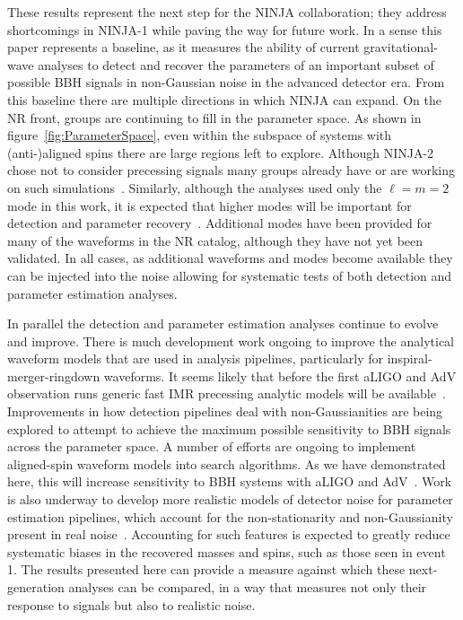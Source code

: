 \documentclass[12pt]{iopart}
\begin{document}
These results represent the next step for the NINJA collaboration;
they address shortcomings in NINJA-1 while paving the way
for future work.  In a sense this paper represents a baseline, as it
measures the ability of current gravitational-wave analyses to detect
and recover the parameters of an important subset of possible BBH
signals in non-Gaussian noise in the advanced detector era. 
From this baseline there are
multiple directions in which NINJA can expand. On the NR front,
groups are continuing to fill in the parameter space.  As shown in
figure~\ref{fig:ParameterSpace}, even within the subspace of systems
with (anti-)aligned spins there are large regions left to explore.
Although NINJA-2 chose not to consider precessing signals many groups
already have or are working on such simulations~\cite{
Campanelli:2008nk, Tichy:2007hk, Tichy:2008du,Schmidt:2010it,
O'Shaughnessy:2011fx,Mroue:2012kv,O'Shaughnessy:2012vm,
O'Shaughnessy:2012ay,Hinder:2013oqa,Taracchini:2013rva}. Similarly, although 
the analyses used only the
$\ell=m=2$ mode in this work, it is expected that higher modes will be
important for detection and parameter
recovery~\cite{Pekowsky:2012sr,Healy:2013jza,McWilliams:2010eq,Brown:2012nn,
Pan:2011gk}.  Additional modes have been provided for many of
the waveforms in the NR catalog, although they have not yet been
validated.  In all cases, as additional waveforms and modes become
available they can be injected into the noise allowing for systematic
tests of both detection and parameter estimation analyses.

In parallel the detection and parameter estimation analyses continue to 
evolve and improve. There is much development work ongoing to improve the 
analytical waveform models that are used in analysis pipelines, particularly 
for inspiral-merger-ringdown waveforms. It seems likely that before the 
first aLIGO and AdV observation runs generic fast IMR precessing analytic 
models will be 
available~\cite{Santamaria:2010yb,Taracchini:2012ig,Pan:2013rra,Hannam:2013oca,
Taracchini:2013rva}.
Improvements in how detection pipelines deal with non-Gaussianities are being 
explored to attempt to achieve the maximum possible sensitivity to BBH signals 
across the parameter space. A number of efforts are ongoing to implement 
aligned-spin waveform models into  search algorithms. As we have demonstrated 
here, this will increase sensitivity to BBH systems with aLIGO and 
AdV~\cite{Brown:2012qf,Ajith:2012mn,Harry:2013tca}.
Work is also underway to develop more realistic models 
of detector noise for parameter estimation pipelines, which account for the 
non-stationarity and non-Gaussianity present in real 
noise~\cite{Littenberg:2013gja}.  Accounting for such features
is expected to greatly reduce systematic biases in the recovered masses and 
spins, such as those seen in event 1.
The results presented here can provide a measure against which these
next-generation analyses can be compared, in a way that measures not only their
response to signals but also to realistic noise.
\end{document}
